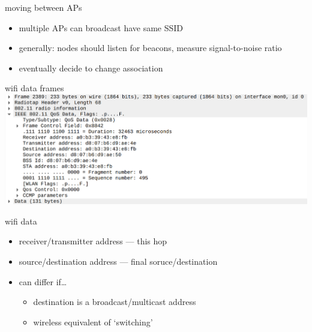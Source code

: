 \begin{frame}{moving between APs}
    \begin{itemize}
    \item multiple APs can broadcast have same SSID
    \item generally: nodes should listen for beacons, measure signal-to-noise ratio
    \vspace{.5cm}
    \item eventually decide to change association
    \end{itemize}
\end{frame}


\begin{frame}{wifi data frames}
\includegraphics[height=0.85\textheight]{../multiaccess/wifi-data-1.png}
\end{frame}

\begin{frame}{wifi data}
    \begin{itemize}
    \item receiver/transmitter address --- this hop
    \item source/destination address --- final soruce/destination
    \vspace{.5cm}
    \item can differ if\ldots
        \begin{itemize}
        \item destination is a broadcast/multicast address
        \item wireless equivalent of `switching'
        \end{itemize}
    \end{itemize}
\end{frame}
